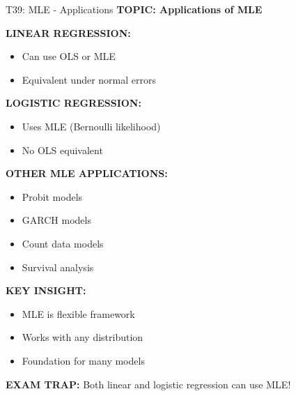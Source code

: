 \documentclass[8pt]{beamer}
\begin{document}
	\begin{frame}{T39: MLE - Applications}
		\fontsize{6.5}{7.5}\selectfont
		\textbf{TOPIC: Applications of MLE}
		
		\vspace{0.1cm}
		\textbf{LINEAR REGRESSION:}
		\begin{itemize}
			\item Can use OLS or MLE
			\item Equivalent under normal errors
		\end{itemize}
		
		\vspace{0.1cm}
		\textbf{LOGISTIC REGRESSION:}
		\begin{itemize}
			\item Uses MLE (Bernoulli likelihood)
			\item No OLS equivalent
		\end{itemize}
		
		\vspace{0.1cm}
		\textbf{OTHER MLE APPLICATIONS:}
		\begin{itemize}
			\item Probit models
			\item GARCH models
			\item Count data models
			\item Survival analysis
		\end{itemize}
		
		\vspace{0.1cm}
		\textbf{KEY INSIGHT:}
		\begin{itemize}
			\item MLE is flexible framework
			\item Works with any distribution
			\item Foundation for many models
		\end{itemize}
		
		\textcolor{myred}{\textbf{EXAM TRAP:}} Both linear and logistic regression can use \textcolor{myblue}{MLE}!
	\end{frame}
	
\end{document}
